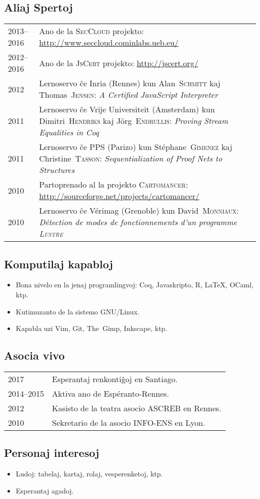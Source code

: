 \documentclass[12pt,a4paper]{article}
\makeatletter
\newcommand{\en}[1]{\foreignlanguage{english}{{#1}}}
\newcommand{\fr}[1]{\foreignlanguage{french}{{#1}}}
\newcommand{\en}[1]{\foreignlanguage{english}{{#1}}}
\newcommand{\fr}[1]{\foreignlanguage{french}{{#1}}}
\newenvironment{datecvsection}[1]%
               {\subsection*{#1}%
                 \noindent \begin{tabular}{@{}p{\annee}p{\texte}@{}}}
               {\end{tabular}}
\newenvironment{itemcvsection}[1]%
               {\subsection*{#1}\begin{itemize}}
               {\end{itemize}}
\newcommand\familyName{\textsc}
\newcommand\placeName{}
\makeatother
\begin{document}
\begin{datecvsection}{Aliaj Spertoj}

	2013–2016 & Ano de la \textsc{SecCloud} projekto:  \url{http://www.seccloud.cominlabs.ueb.eu/} \\

	2012–2016 & Ano de la \textsc{JsCert} projekto:  \url{http://jscert.org/} \\

    2012 & Lernoservo ĉe \placeName{Inria} (\placeName{Rennes}) kun Alan~\familyName{Schmitt} kaj Thomas~\familyName{Jensen}:
	\en{\textit{A Certified JavaScript Interpreter}} \\

    2011 & Lernoservo ĉe \placeName{Vrĳe Universiteit} (\placeName{Amsterdam}) kun Dimitri~\familyName{Hendriks} kaj Jörg~\familyName{Endrullis}:
	\en{\textit{Proving Stream Equalities in Coq}} \\

    2011 & Lernoservo ĉe \placeName{PPS} (\placeName{Parizo}) kun Stéphane~\familyName{Gimenez} kaj Christine~\familyName{Tasson}:
	\en{\textit{Sequentialization of Proof Nets to Structures}} \\

	2010 & Partoprenado al la projekto \textsc{Cartomancer}:  \url{http://sourceforge.net/projects/cartomancer/} \\

    2010 & Lernoservo ĉe \placeName{Vérimag} (\placeName{Grenoble}) kun David~\familyName{Monniaux}:
    \fr{\textit{Détection de modes de fonctionnements d’un programme \textsc{Lustre}}} \\

\end{datecvsection}

\begin{itemcvsection}{Komputilaj kapabloj}

  \item Bona nivelo en la jenaj programlingvoj:  Coq, Javaskripto, R, \LaTeX, OCaml, ktp.
  \item Kutimuzanto de la sistemo GNU/Linux.
  \item Kapabla uzi Vim, Git, The~Gimp, Inkscape, ktp.

\end{itemcvsection}

\begin{datecvsection}{Asocia vivo}

		2017 & Esperantaj renkontiĝoj en \placeName{Santiago}. \\
		2014–2015 & Aktiva ano de {Espéranto-Rennes}. \\
		2012 & Kasisto de la teatra asocio {ASCREB} en \placeName{Rennes}. \\
		2010 & Sekretario de la asocio \textsc{INFO-ENS} en \placeName{Lyon}.

\end{datecvsection}

\begin{itemcvsection}{Personaj interesoj}

  \item Ludoj: tabelaj, kartaj, rolaj, vesperenketoj, ktp.
  \item Esperantaj agadoj.

\end{itemcvsection}
\end{document}

